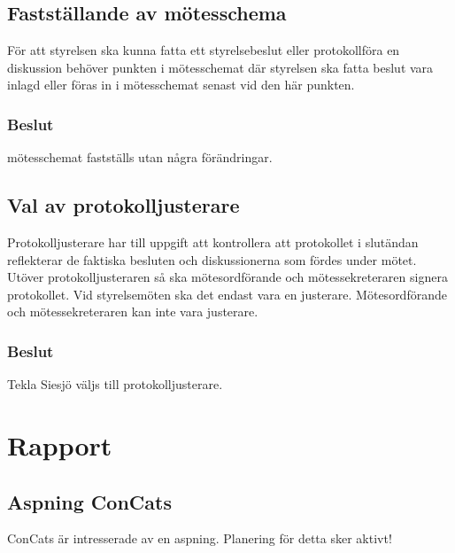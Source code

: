 \documentclass[protokoll]{dvd}
\begin{document}
\subsection{Fastställande av mötesschema}

För att styrelsen ska kunna fatta ett styrelsebeslut eller protokollföra en diskussion
behöver punkten i mötesschemat där styrelsen ska fatta beslut
vara inlagd eller föras in i mötesschemat senast vid den här punkten.

\subsubsection*{Beslut}

\begin{attsatser}
    \item mötesschemat fastställs utan några förändringar.
\end{attsatser}

\subsection{Val av protokolljusterare}

Protokolljusterare har till uppgift att kontrollera att protokollet
i slutändan reflekterar de faktiska besluten och diskussionerna som fördes under mötet.
Utöver protokolljusteraren så ska mötesordförande och mötessekreteraren signera protokollet.
Vid styrelsemöten ska det endast vara en justerare.
Mötesordförande och mötessekreteraren kan inte vara justerare.

\subsubsection*{Beslut}
\begin{attsatser}
    \item Tekla Siesjö väljs till protokolljusterare.
\end{attsatser}


\section{Rapport}
    \subsection{Aspning ConCats}
    ConCats är intresserade av en aspning. Planering för detta sker aktivt!


\end{document}
